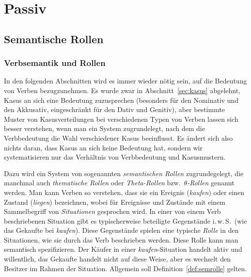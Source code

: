 \chapter{Passiv}
\label{sec:Passiv}

\section{Semantische Rollen}
\label{sec:semantischerollen}

\subsection{Verbsemantik und Rollen}
\label{sec:verbsemantikundrollen}

In den folgenden Abschnitten wird es immer wieder nötig sein, auf die Bedeutung von Verben bezugzunehmen.
Es wurde zwar in Abschnitt~\ref{sec:kasus} abgelehnt, Kasus an sich eine Bedeutung zuzusprechen (besonders für den Nominativ und den Akkusativ, eingeschränkt für den Dativ und Genitiv), aber bestimmte Muster von Kasusverteilungen bei verschiedenen Typen von Verben lassen sich besser verstehen, wenn man ein System zugrundelegt, nach dem die Verbbedeutung die Wahl verschiedener Kasus beeinflusst.
Es ändert sich also nichts daran, dass Kasus an sich keine Bedeutung hat, sondern wir systematisieren nur das Verhältnis von Verbbedeutung und Kasusmustern.

Dazu wird ein System von sogenannten \textit{semantischen Rollen} zugrundegelegt, die manchmal auch \textit{thematische Rollen} oder \textit{Theta-Rollen} bzw.\ $\theta$\textit{-Rollen} genannt werden.
Man kann Verben so verstehen, dass sie ein Ereignis (\zB \textit{kaufen}) oder einen Zustand (\zB \textit{liegen}) bezeichnen, wobei für Ereignisse und Zustände mit einem Sammelbegriff von \textit{Situationen} gesprochen wird.
In einer von einem Verb beschriebenen Situation gibt es typischerweise beteiligte Gegenstände i.\,w.\,S.\ (wie das Gekaufte bei \textit{kaufen}).
Diese Gegenstände spielen eine typische \textit{Rolle} in den Situationen, wie sie durch das Verb beschrieben werden.
Diese Rolle kann man semantisch spezifizieren.
Der Käufer in einer \textit{kaufen}-Situation handelt \zB aktiv und willentlich, das Gekaufte handelt nicht auf diese Weise, aber es wechselt den Besitzer im Rahmen der Situation.
Allgemein soll Definition~\ref{def:semrolle} gelten.


